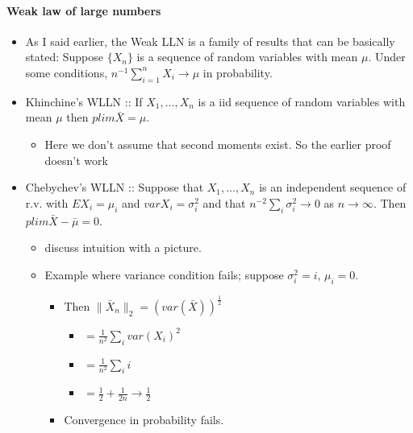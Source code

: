 \paragraph{Weak law of large numbers}
\begin{itemize}
\item As I said earlier, the Weak LLN is a family of results that can
       be basically stated: Suppose $\{X_n\}$ is a sequence of random
       variables with mean $\mu$.  Under some conditions, $n^{-1}
       \sum_{i=1}^n X_i \to \mu$ in probability.
\item Khinchine's WLLN :: If $X_1,\dots,X_n$ is a iid sequence of
          random variables with mean $\mu$ then $plim \bar X = \mu$.
\begin{itemize}
\item Here we don't assume that second moments exist.  So the earlier
         proof doesn't work
\end{itemize}
\item Chebychev's WLLN :: Suppose that $X_1,\dots,X_n$ is an
          independent sequence of r.v. with $E X_i = \mu_i$ and $var
          X_i = \sigma_i^2$ and that $n^{-2} \sum_i \sigma_i^2 \to 0$
          as $n \to \infty$.  Then $plim \bar X - \bar \mu = 0$.
\begin{itemize}
\item discuss intuition with a picture.
\item Example where variance condition fails; suppose $\sigma_i^2 = i$, $\mu_i = 0$.
\begin{itemize}
\item Then $\|\bar X_n\|_2 = (var(\bar X))^{\frac12}$
\begin{itemize}
\item $= \frac{1}{n^2} \sum_i var(X_i)^2$
\item $= \frac{1}{n^2} \sum_i i$
\item $= \frac12 + \frac{1}{2n} \to \frac{1}{2}$
\end{itemize}
\item Convergence in probability fails.
\end{itemize}
\end{itemize}
\end{itemize}


